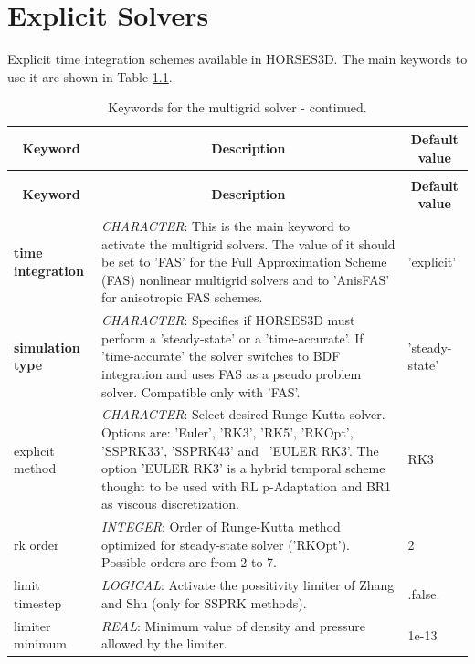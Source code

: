 \documentclass[a4paper,10pt]{report}
\begin{document}

\chapter{Explicit Solvers}

Explicit time integration schemes available in HORSES3D.
The main keywords to use it are shown in Table \ref{tab:explicitKey}.

\begin{longtable}{|p{4cm}|p{10cm}|p{2.2cm}|}
\caption{Keywords for the multigrid solver.} \label{tab:explicitKey} \\
\hline
\multicolumn{1}{|c|}{\textbf{Keyword}} & \multicolumn{1}{c|}{\textbf{Description}} & \multicolumn{1}{c|}{\textbf{Default value}} \\ \hline
\endfirsthead

\caption{Keywords for the multigrid solver - continued.} \\
\hline
\multicolumn{1}{|c|}{\textbf{Keyword}} & \multicolumn{1}{c|}{\textbf{Description}} & \multicolumn{1}{c|}{\textbf{Default value}} \\ \hline
\endhead

\textbf{time integration} & \textit{CHARACTER}: This is the main keyword to activate the multigrid solvers. The value of it should be set to 'FAS' for the Full Approximation Scheme (FAS) nonlinear multigrid  solvers and to 'AnisFAS' for anisotropic FAS schemes. & 'explicit' \\ \hline

\textbf{simulation type} & \textit{CHARACTER}: Specifies if HORSES3D must perform a ’steady-state’ or a ’time-accurate’. If 'time-accurate' the solver switches to BDF integration and uses FAS as a pseudo problem solver. Compatible only with 'FAS'. & 'steady-state' \\ \hline

explicit method & \textit{CHARACTER}: Select desired Runge-Kutta solver. Options are: 'Euler', 'RK3', 'RK5', 'RKOpt', 'SSPRK33',  'SSPRK43' and \, 'EULER RK3'. The option 'EULER RK3' is a hybrid temporal scheme thought to be used with RL p-Adaptation and BR1 as viscous discretization. & RK3 \\ \hline

rk order & \textit{INTEGER}: Order of Runge-Kutta method optimized for steady-state solver ('RKOpt'). Possible orders are from 2 to 7. & 2 \\ \hline

limit timestep & \textit{LOGICAL}: Activate the possitivity limiter of Zhang and Shu (only for SSPRK methods). & .false. \\ \hline

limiter minimum & \textit{REAL}: Minimum value of density and pressure allowed by the limiter. & 1e-13 \\ \hline

\end{longtable}
\end{document}
